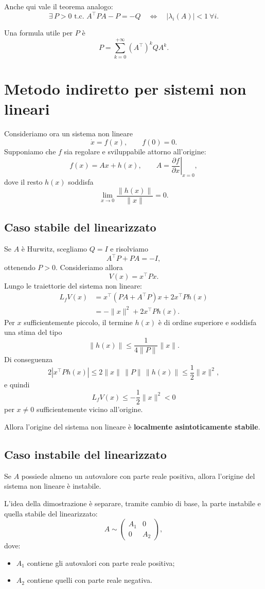 Anche qui vale il teorema analogo:
\[
\exists\, P>0 \text{ t.c. } A^\top P A - P = -Q
\quad \Longleftrightarrow \quad
|\lambda_i(A)|<1 \ \forall i.
\]

Una formula utile per \(P\) \`e
\[
P = \sum_{k=0}^{+\infty} (A^\top)^k Q A^k.
\]

\section{Metodo indiretto per sistemi non lineari}

Consideriamo ora un sistema non lineare
\[
\dot x = f(x),
\qquad
f(0)=0.
\]
Supponiamo che \(f\) sia regolare e sviluppabile attorno all'origine:
\[
f(x)=Ax+h(x),
\qquad
A=\left.\frac{\partial f}{\partial x}\right|_{x=0},
\]
dove il resto \(h(x)\) soddisfa
\[
\lim_{x\to 0}\frac{\|h(x)\|}{\|x\|}=0.
\]

\subsection{Caso stabile del linearizzato}

Se \(A\) \`e Hurwitz, scegliamo \(Q=I\) e risolviamo
\[
A^\top P + PA = -I,
\]
ottenendo \(P>0\). Consideriamo allora
\[
V(x)=x^\top P x.
\]
Lungo le traiettorie del sistema non lineare:
\begin{align*}
L_fV(x)
&= x^\top(PA+A^\top P)x + 2x^\top P h(x)\\
&= -\|x\|^2 + 2x^\top P h(x).
\end{align*}
Per \(x\) sufficientemente piccolo, il termine \(h(x)\) \`e di ordine superiore e soddisfa una stima del tipo
\[
\|h(x)\| \le \frac{1}{4\|P\|}\|x\|.
\]
Di conseguenza
\[
2|x^\top P h(x)| \le 2\|x\|\,\|P\|\,\|h(x)\|
\le \frac12 \|x\|^2,
\]
e quindi
\[
L_fV(x)\le -\frac12\|x\|^2<0
\]
per \(x\neq 0\) sufficientemente vicino all'origine.

Allora l'origine del sistema non lineare \`e \textbf{localmente asintoticamente stabile}.

\subsection{Caso instabile del linearizzato}

Se \(A\) possiede almeno un autovalore con parte reale positiva, allora l'origine del sistema non lineare \`e instabile.

L'idea della dimostrazione \`e separare, tramite cambio di base, la parte instabile e quella stabile del linearizzato:
\[
A \sim
\begin{pmatrix}
A_1 & 0\\
0 & A_2
\end{pmatrix},
\]
dove:
\begin{itemize}
    \item \(A_1\) contiene gli autovalori con parte reale positiva;
    \item \(A_2\) contiene quelli con parte reale negativa.
\end{itemize}

